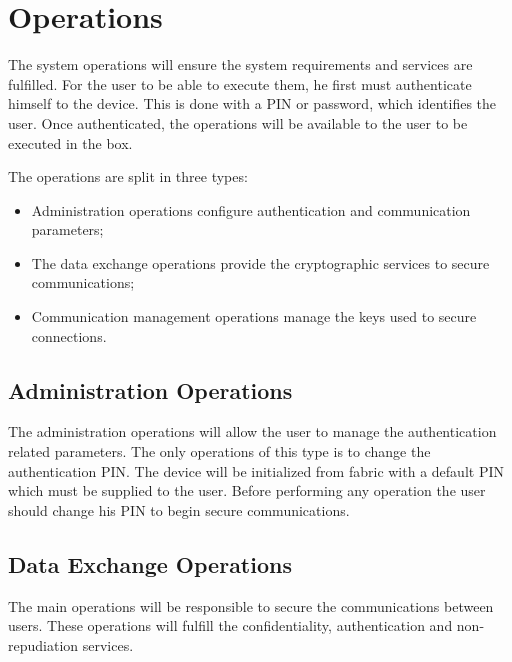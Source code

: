 \section{Operations}\label{chap:arch:ops}

The system operations will ensure the system requirements and services are fulfilled.
For the user to be able to execute them, he first must authenticate himself to the device. This is done with a \ac{PIN} or password, which identifies the user. Once authenticated, the operations will be available to the user to be executed in the box.

The operations are split in three types:
\begin{itemize}
    \item Administration operations configure authentication and communication parameters;
    \item The data exchange operations provide the cryptographic services to secure communications;
    \item Communication management operations manage the keys used to secure connections.
\end{itemize}

\subsection{Administration Operations}\label{chap:arch:ops:administration}

The administration operations will allow the user to manage the authentication related parameters.
The only operations of this type is to change the authentication \ac{PIN}. The device will be initialized from fabric with a default \ac{PIN} which must be supplied to the user. Before performing any operation the user should change his PIN to begin secure communications.

\subsection{Data Exchange Operations}\label{chap:arch:ops:data}

The main operations will be responsible to secure the communications between users. These operations will fulfill the confidentiality, authentication and non-repudiation services.

